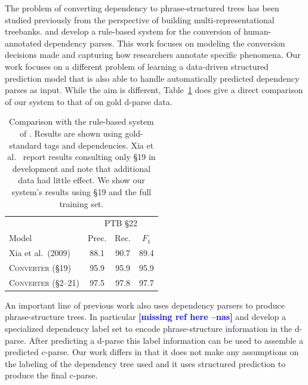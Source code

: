\documentclass[11pt,letterpaper]{article}
\newcommand{\ParseName}{\textsc{Converter}\xspace}
\newcommand{\nascomment}[1]{\textcolor{blue}{\bf \small [#1 --nas]}}
\begin{document}
The problem of converting dependency to phrase-structured trees has
been studied previously from the perspective of building
multi-representational treebanks.   and
 develop a rule-based system for the
conversion of human-annotated dependency parses. This work focuses on
modeling the conversion decisions made and capturing how researchers
annotate specific phenomena. Our work focuses on a different problem
of learning a data-driven structured prediction model that is also
able to handle automatically predicted dependency parses as
input. While the aim is different, Table~\ref{tab:convert} does give a
direct comparison of our system to that of  on 
gold d-parse data.


\begin{table}
  \centering
  \small
  \begin{tabular}{lccc}

    \toprule
    & \multicolumn{3}{c}{PTB \S 22} \\
    Model & Prec. & Rec. & $F_1$  \\
    \midrule

   
    Xia et al.~(2009)    & 88.1 & 90.7 & 89.4 \\
    \ParseName{} (\S 19)  & 95.9 & 95.9 & 95.9    \\
    \ParseName{}  (\S 2--21) & 97.5 & 97.8 & 97.7    \\
    \bottomrule

  \end{tabular}
  \caption{Comparison with the rule-based system of .
    Results are shown using gold-standard tags and
    dependencies.  Xia et al.~
 report results consulting only \S 19 in development and
note that additional data had little effect.  We show our system's
results using \S 19 and the full training set. 
  \label{tab:convert}}
\end{table}


An important line of previous work also uses dependency parsers to
produce phrase-structure trees. In particular 
\nascomment{missing ref here}  and
 develop a specialized dependency label
set to encode phrase-structure information in the d-parse. After
predicting a d-parse this label information can be used to assemble
a predicted c-parse. Our work differs in that it does not make any
assumptions on the labeling of the dependency tree used and it uses  
 structured prediction to produce the final c-parse.
\end{document}
